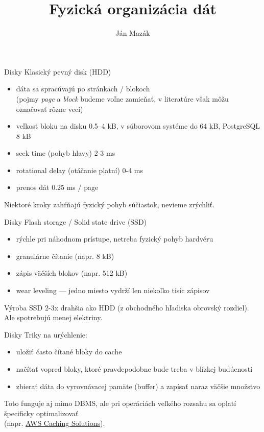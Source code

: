 \documentclass[12pt]{beamer}
\title{Fyzická organizácia dát}
\author{Ján Mazák}
\institute{FMFI UK Bratislava}
\date{}
\begin{document}
\frame{\titlepage}

\begin{frame}[fragile]{Disky}
Klasický pevný disk (HDD)
\begin{itemize}
\item dáta sa spracúvajú po stránkach / blokoch\\
  (pojmy \emph{page} a \emph{block} budeme voľne zamieňať, v literatúre však môžu označovať rôzne veci)
\item veľkosť bloku na disku 0.5--4 kB, v súborovom systéme do 64 kB, PostgreSQL 8 kB
\item seek time (pohyb hlavy) 2-3 ms
\item rotational delay (otáčanie platní) 0-4 ms
\item prenos dát 0.25 ms / page
\end{itemize}
Niektoré kroky zahŕňajú fyzický pohyb súčiastok, nevieme zrýchliť.\\
\end{frame}

\begin{frame}[fragile]{Disky}
Flash storage / Solid state drive (SSD)
\begin{itemize}
\item rýchle pri náhodnom prístupe, netreba fyzický pohyb hardvéru
\item granulárne čítanie (napr. 8 kB)
\item zápis väčších blokov (napr. 512 kB)
\item wear leveling --- jedno miesto vydrží len niekoľko tisíc zápisov
\end{itemize}
Výroba SSD 2-3x drahšia ako HDD (z obchodného hľadiska obrovský rozdiel).
Ale spotrebujú menej elektriny.
\end{frame}

\begin{frame}[fragile]{Disky}
Triky na urýchlenie:
\begin{itemize}
\item uložiť často čítané bloky do cache
\item načítať vopred bloky, ktoré pravdepodobne bude treba v blízkej budúcnosti
\item zbierať dáta do vyrovnávacej pamäte (buffer) a zapísať naraz väčšie množstvo
\end{itemize}
Toto funguje aj mimo DBMS, ale pri operáciách veľkého rozsahu sa oplatí špecificky optimalizovať\\
(napr. \href{https://aws.amazon.com/caching/aws-caching/}{AWS Caching Solutions}).
\end{frame}
\end{document}
